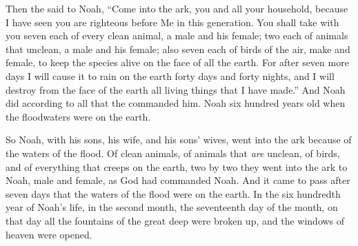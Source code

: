 
\bverse Then the \lord said to Noah, ``Come into the ark, you and all your household, because I have seen \that you are righteous before Me in this generation.
\bverse You shall take with you seven each of every clean animal, a male and his female; two each of animals that \are unclean, a male and his female;
\bverse also seven each of birds of the air, make and female, to keep the species alive on the face of all the earth.
\bverse For after seven more days I will cause it to rain on the earth forty days and forty nights, and I will destroy from the face of the earth all living things that I have made.''
\bverse And Noah did according to all that the \lord commanded him.
\bverse Noah \was six hundred years old when the floodwaters were on the earth.

\bverse So Noah, with his sons, his wife, and his sons' wives, went into the ark because of the waters of the flood.
\bverse Of clean animals, of animals that \textit{are} unclean, of birds, and of everything that creeps on the earth,
\bverse two by two they went into the ark to Noah, male and female, as God had commanded Noah.
\bverse And it came to pass after seven days that the waters of the flood were on the earth.
\bverse In the six hundredth year of Noah's life, in the second month, the seventeenth day of the month, on that day all the fountains of the great deep were broken up, and the windows of heaven were opened.

